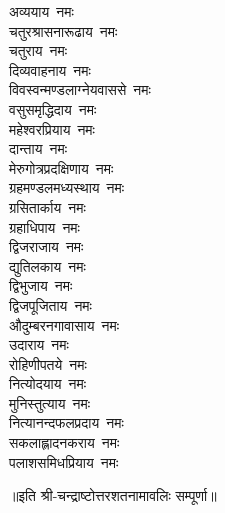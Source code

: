 \begin{flushleft}
\begin{multicols}{2}
अव्ययाय~नमः\\
चतुरश्रासनारूढाय~नमः\\
चतुराय~नमः\\
दिव्यवाहनाय~नमः\\
विवस्वन्मण्डलाग्नेयवाससे~नमः\\
वसुसमृद्धिदाय~नमः\hfill{}\\
महेश्वरप्रियाय~नमः\\
दान्ताय~नमः\\
मेरुगोत्रप्रदक्षिणाय~नमः\\
ग्रहमण्डलमध्यस्थाय~नमः\\
ग्रसितार्काय~नमः\\
ग्रहाधिपाय~नमः\\
द्विजराजाय~नमः\\
द्युतिलकाय~नमः\\
द्विभुजाय~नमः\\
द्विजपूजिताय~नमः\hfill{}\\
औदुम्बरनगावासाय~नमः\\
उदाराय~नमः\\
रोहिणीपतये~नमः\\
नित्योदयाय~नमः\\
मुनिस्तुत्याय~नमः\\
नित्यानन्दफलप्रदाय~नमः\\
सकलाह्लादनकराय~नमः\\
पलाशसमिधप्रियाय~नमः\\
\end{multicols}
\end{flushleft}
॥इति श्री-चन्द्राष्टोत्तरशतनामावलिः सम्पूर्णा॥
